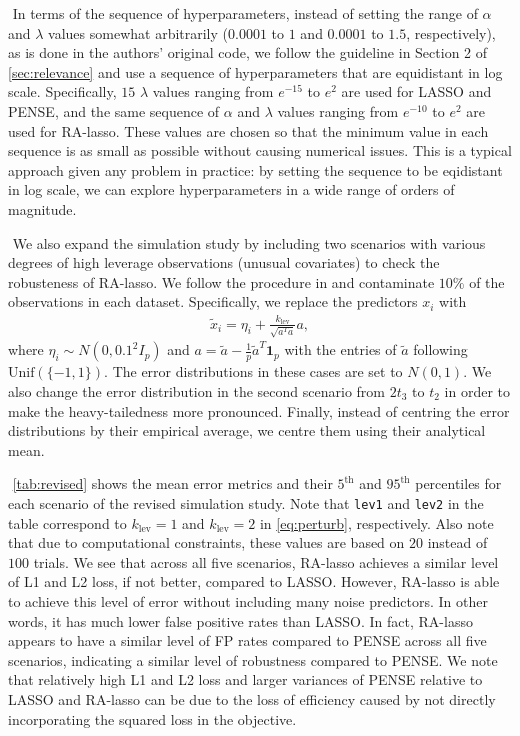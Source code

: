 $ $\newline
In terms of the sequence of hyperparameters, instead of setting the range of $\alpha$ and $\lambda$ values somewhat arbitrarily ($0.0001$ to $1$ and $0.0001$ to $1.5$, respectively), as is done in the authors' original code, we follow the guideline in Section 2 of \cref{sec:relevance} and use a sequence of hyperparameters that are equidistant in log scale. Specifically, $15$ $\lambda$ values ranging from $e^{-15}$ to $e^2$ are used for LASSO and PENSE, and the same sequence of $\alpha$ and $\lambda$ values ranging from $e^{-10}$ to $e^2$ are used for RA-lasso. These values are chosen so that the minimum value in each sequence is as small as possible without causing numerical issues. This is a typical approach given any problem in practice: by setting the sequence to be eqidistant in log scale, we can explore hyperparameters in a wide range of orders of magnitude.

$ $\newline
We also expand the simulation study by including two scenarios with various degrees of high leverage observations (unusual covariates) to check the robusteness of RA-lasso. We follow the procedure in \citet{maronna2011robust} and contaminate $10\%$ of the observations in each dataset. Specifically, we replace the predictors $x_i$ with
\begin{align}
\tilde{x}_i = \eta_i + \frac{k_\text{lev}}{\sqrt{a^Ta}}a, \label{eq:perturb}
\end{align}
where $\eta_i \sim N(0, 0.1^2I_p)$ and $a = \tilde{a} - \frac{1}{p}\tilde{a}^T\bm{1}_p$ with the entries of $\tilde{a}$ following $\text{Unif}(\{-1, 1\})$. The error distributions in these cases are set to $N(0,1)$. We also change the error distribution in the second scenario from $2t_3$ to $t_2$ in order to make the heavy-tailedness more pronounced. Finally, instead of centring the error distributions by their empirical average, we centre them using their analytical mean.

$ $\newline
\cref{tab:revised} shows the mean error metrics and their $5^\text{th}$ and $95^\text{th}$ percentiles for each scenario of the revised simulation study. Note that \texttt{lev1} and \texttt{lev2} in the table correspond to $k_\text{lev}=1$ and $k_\text{lev}=2$ in \cref{eq:perturb}, respectively. Also note that due to computational constraints, these values are based on $20$ instead of $100$ trials. We see that across all five scenarios, RA-lasso achieves a similar level of L1 and L2 loss, if not better, compared to LASSO. However, RA-lasso is able to achieve this level of error without including many noise predictors. In other words, it has much lower false positive rates than LASSO. In fact, RA-lasso appears to have a similar level of FP rates compared to PENSE across all five scenarios, indicating a similar level of robustness compared to PENSE. We note that relatively high L1 and L2 loss and larger variances of PENSE relative to LASSO and RA-lasso can be due to the loss of efficiency caused by not directly incorporating the squared loss in the objective.
